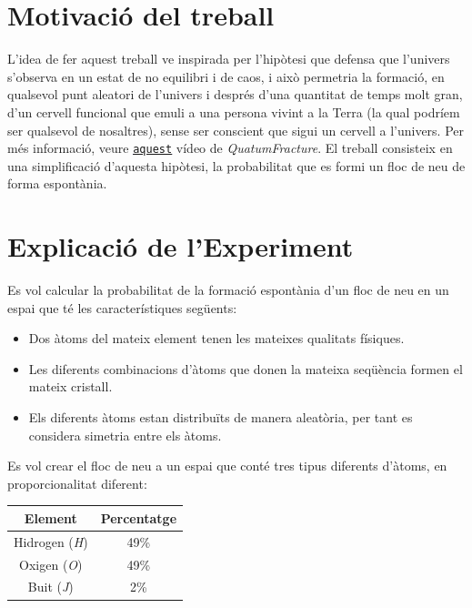 \documentclass[12pt]{report}
\begin{document}
\newpage
\setcounter{page}{3}
\pagestyle{plain}
\tableofcontents
\cleardoublepage
{}

\chapter{Motivació del treball}


L'idea de fer aquest treball ve inspirada per l'hipòtesi que defensa que l'univers s'observa en un estat de no equilibri i de caos, i això permetria la formació, en qualsevol punt aleatori de l'univers i després d'una quantitat de temps molt gran, d'un cervell funcional que emuli a una persona vivint a la Terra (la qual podríem ser qualsevol de nosaltres), sense ser conscient que sigui un cervell a l'univers. \newline 
Per més informació, veure \texttt{\textcolor{navy}{\underline{\href{https://bit.ly/3fxl9hT}{aquest}}}} vídeo de \textit{QuatumFracture}.\newline
\newline El treball consisteix en una simplificació d'aquesta hipòtesi, la probabilitat que es formi un floc de neu de forma espontània. 



\chapter{Explicació de l'Experiment}

Es vol calcular la probabilitat de la formació espontània d’un floc de neu en un espai que té les característiques següents: 
\begin{itemize}
    \item Dos àtoms del mateix element tenen les mateixes qualitats físiques.
    \item Les diferents combinacions d’àtoms que donen la mateixa seqüència formen el mateix cristall.
    \item Els diferents àtoms estan distribuïts de manera aleatòria, per tant es considera simetria entre els àtoms.
\end{itemize}
Es vol crear el floc de neu a un espai que conté tres tipus diferents d’àtoms, en proporcionalitat diferent:

\begin{center}
    \begin{tabular}{c|c}
     Element & Percentatge \\ \hline
      Hidrogen (\textit{H}) & 49\%\\
      Oxigen (\textit{O}) & 49\%\\
      Buit (\textit{J}) & 2\%\\
\end{tabular}
\end{center}
\end{document}
